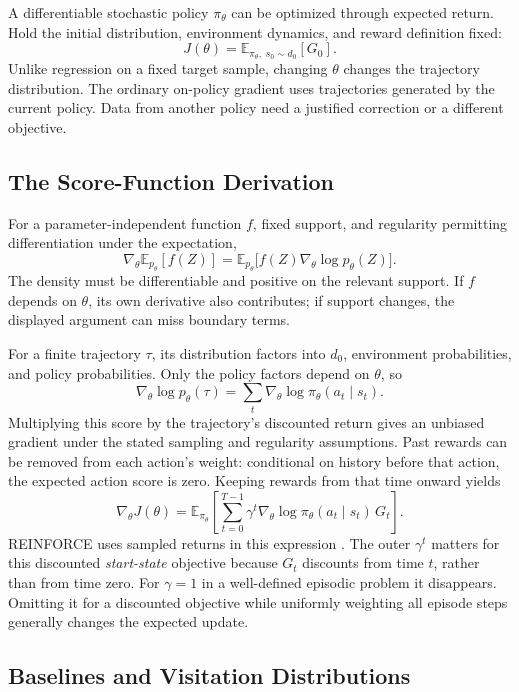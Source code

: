 A differentiable stochastic policy $\pi_\theta$ can be optimized through expected return. Hold the initial distribution, environment dynamics, and reward definition fixed:
\[
J(\theta)=\mathbb E_{\pi_\theta,\;s_0\sim d_0}[G_0].
\]
Unlike regression on a fixed target sample, changing $\theta$ changes the trajectory distribution. The ordinary on-policy gradient uses trajectories generated by the current policy. Data from another policy need a justified correction or a different objective.

\subsection{The Score-Function Derivation}

For a parameter-independent function $f$, fixed support, and regularity permitting differentiation under the expectation,
\[
\nabla_\theta\mathbb E_{p_\theta}[f(Z)]
=\mathbb E_{p_\theta}
\bigl[f(Z)\nabla_\theta\log p_\theta(Z)\bigr].
\]
The density must be differentiable and positive on the relevant support. If $f$ depends on $\theta$, its own derivative also contributes; if support changes, the displayed argument can miss boundary terms.

For a finite trajectory $\tau$, its distribution factors into $d_0$, environment probabilities, and policy probabilities. Only the policy factors depend on $\theta$, so
\[
\nabla_\theta\log p_\theta(\tau)
=\sum_t\nabla_\theta\log\pi_\theta(a_t\mid s_t).
\]
Multiplying this score by the trajectory's discounted return gives an unbiased gradient under the stated sampling and regularity assumptions. Past rewards can be removed from each action's weight: conditional on history before that action, the expected action score is zero. Keeping rewards from that time onward yields
\[
\nabla_\theta J(\theta)
=\mathbb E_{\pi_\theta}
\left[\sum_{t=0}^{T-1}\gamma^t
\nabla_\theta\log\pi_\theta(a_t\mid s_t)\,G_t\right].
\]
REINFORCE uses sampled returns in this expression \citep{williams1992reinforce}. The outer $\gamma^t$ matters for this discounted \emph{start-state} objective because $G_t$ discounts from time $t$, rather than from time zero. For $\gamma=1$ in a well-defined episodic problem it disappears. Omitting it for a discounted objective while uniformly weighting all episode steps generally changes the expected update.

\subsection{Baselines and Visitation Distributions}

